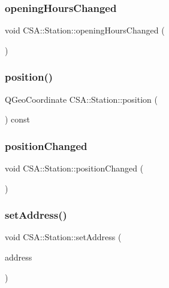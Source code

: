 \subsubsection{\texorpdfstring{opening\+Hours\+Changed}{openingHoursChanged}}
{\footnotesize\ttfamily void C\+S\+A\+::\+Station\+::opening\+Hours\+Changed (\begin{DoxyParamCaption}{ }\end{DoxyParamCaption})\hspace{0.3cm}{\ttfamily [signal]}}

\mbox{\label{classCSA_1_1Station_a94249de9cc38d704eb6e77aca24daaea}} 
\subsubsection{\texorpdfstring{position()}{position()}}
{\footnotesize\ttfamily Q\+Geo\+Coordinate C\+S\+A\+::\+Station\+::position (\begin{DoxyParamCaption}{ }\end{DoxyParamCaption}) const}

\mbox{\label{classCSA_1_1Station_aceeec2e80a0a991acb3b74c539769bd8}} 
\subsubsection{\texorpdfstring{position\+Changed}{positionChanged}}
{\footnotesize\ttfamily void C\+S\+A\+::\+Station\+::position\+Changed (\begin{DoxyParamCaption}{ }\end{DoxyParamCaption})\hspace{0.3cm}{\ttfamily [signal]}}

\mbox{\label{classCSA_1_1Station_a1dccb38e4df4c82b6db033df6366ccfb}} 
\subsubsection{\texorpdfstring{set\+Address()}{setAddress()}}
{\footnotesize\ttfamily void C\+S\+A\+::\+Station\+::set\+Address (\begin{DoxyParamCaption}\item[{const Q\+Geo\+Address \&}]{address }\end{DoxyParamCaption})}

